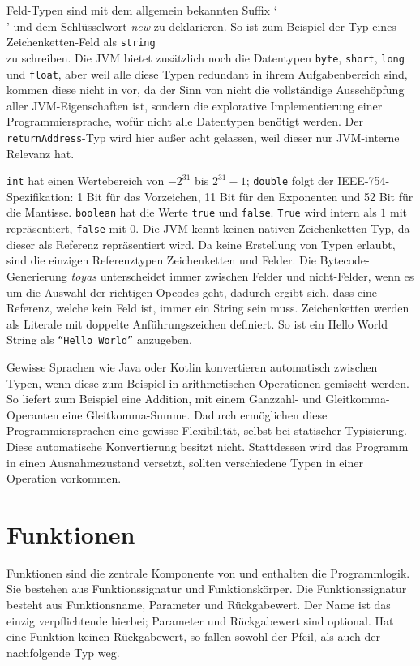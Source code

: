 Feld-Typen sind mit dem allgemein bekannten Suffix `\texttt{\[\]}' und dem Schlüsselwort \textit{new} zu deklarieren. So ist zum Beispiel der Typ eines Zeichenketten-Feld als \texttt{string\[\]} zu schreiben. Die JVM bietet zusätzlich noch die Datentypen \texttt{byte}, \texttt{short}, \texttt{long} und \texttt{float}, aber weil alle diese Typen redundant in ihrem Aufgabenbereich sind, kommen diese nicht in \toya vor, da der Sinn von \toya nicht die vollständige Ausschöpfung aller JVM-Eigenschaften ist, sondern die explorative Implementierung einer Programmiersprache, wofür nicht alle Datentypen benötigt werden. Der \texttt{returnAddress}-Typ wird hier außer acht gelassen, weil dieser nur JVM-interne Relevanz hat.

\texttt{int} hat einen Wertebereich von $-2^{31}$ bis $2^{31} - 1$; \texttt{double} folgt der IEEE-754-Spezifikation: 1 Bit für das Vorzeichen, 11 Bit für den Exponenten und 52 Bit für die Mantisse. \texttt{boolean} hat die Werte \texttt{true} und \texttt{false}. \texttt{True} wird intern als $1$ mit repräsentiert, \texttt{false} mit 0. Die JVM kennt keinen nativen Zeichenketten-Typ, da dieser als Referenz repräsentiert wird. Da \toya keine Erstellung von Typen erlaubt, sind die einzigen Referenztypen Zeichenketten und Felder. Die Bytecode-Generierung \textit{toyas} unterscheidet immer zwischen Felder und nicht-Felder, wenn es um die Auswahl der richtigen Opcodes geht, dadurch ergibt sich, dass eine Referenz, welche kein Feld ist, immer ein String sein muss. Zeichenketten werden als Literale mit doppelte Anführungszeichen definiert. So ist ein Hello World String als \texttt{``Hello World''} anzugeben.

Gewisse Sprachen wie Java oder Kotlin konvertieren automatisch zwischen Typen, wenn diese zum Beispiel in arithmetischen Operationen gemischt werden. So liefert zum Beispiel eine Addition, mit einem Ganzzahl- und Gleitkomma-Operanten eine Gleitkomma-Summe. Dadurch ermöglichen diese Programmiersprachen eine gewisse Flexibilität, selbst bei statischer Typisierung. Diese automatische Konvertierung besitzt \toya nicht. Stattdessen wird das Programm in einen Ausnahmezustand versetzt, sollten verschiedene Typen in einer Operation vorkommen.

\section{Funktionen}

Funktionen sind die zentrale Komponente von \toya und enthalten die Programmlogik.
Sie bestehen aus Funktionssignatur und Funktionskörper. Die Funktionssignatur besteht aus Funktionsname, Parameter und Rückgabewert. Der Name ist das einzig verpflichtende hierbei; Parameter und Rückgabewert sind optional. Hat eine Funktion keinen Rückgabewert, so fallen sowohl der Pfeil, als auch der nachfolgende Typ weg.

